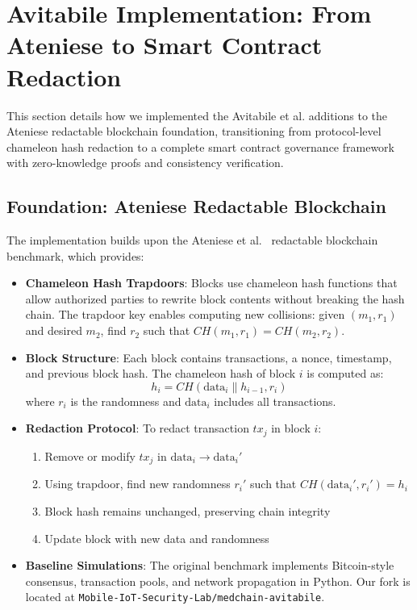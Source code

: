 \section{Avitabile Implementation: From Ateniese to Smart Contract Redaction}
\label{sec:avitabile_implementation}

This section details how we implemented the Avitabile et al. additions to the Ateniese redactable blockchain foundation, transitioning from protocol-level chameleon hash redaction to a complete smart contract governance framework with zero-knowledge proofs and consistency verification.

\subsection{Foundation: Ateniese Redactable Blockchain}

The implementation builds upon the Ateniese et al.~\cite{ateniese2017redactable} redactable blockchain benchmark, which provides:

\begin{itemize}
    \item \textbf{Chameleon Hash Trapdoors}: Blocks use chameleon hash functions that allow authorized parties to rewrite block contents without breaking the hash chain. The trapdoor key enables computing new collisions: given $(m_1, r_1)$ and desired $m_2$, find $r_2$ such that $CH(m_1, r_1) = CH(m_2, r_2)$.
    
    \item \textbf{Block Structure}: Each block contains transactions, a nonce, timestamp, and previous block hash. The chameleon hash of block $i$ is computed as:
    \begin{equation}
        h_i = CH(\text{data}_i \| h_{i-1}, r_i)
    \end{equation}
    where $r_i$ is the randomness and $\text{data}_i$ includes all transactions.
    
    \item \textbf{Redaction Protocol}: To redact transaction $tx_j$ in block $i$:
    \begin{enumerate}
        \item Remove or modify $tx_j$ in $\text{data}_i \to \text{data}_i'$
        \item Using trapdoor, find new randomness $r_i'$ such that $CH(\text{data}_i', r_i') = h_i$
        \item Block hash remains unchanged, preserving chain integrity
        \item Update block with new data and randomness
    \end{enumerate}
    
    \item \textbf{Baseline Simulations}: The original benchmark implements Bitcoin-style consensus, transaction pools, and network propagation in Python. Our fork is located at \texttt{Mobile-IoT-Security-Lab/medchain-avitabile}.
\end{itemize}


